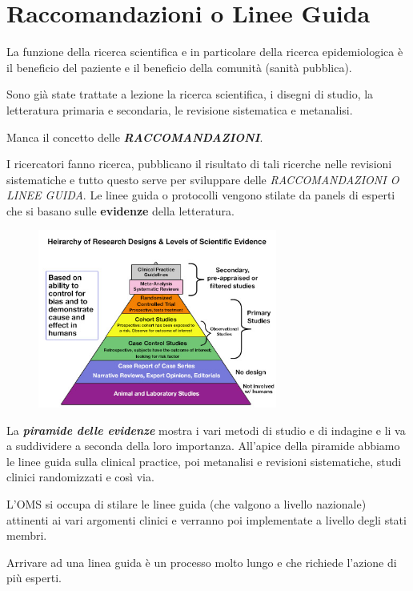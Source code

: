 \section{Raccomandazioni o Linee Guida}

La funzione della ricerca scientifica e in particolare della ricerca epidemiologica è il beneficio del paziente e il beneficio della comunità (sanità pubblica).

Sono già state trattate a lezione la ricerca scientifica, i disegni di studio, la letteratura primaria e secondaria, le revisione sistematica e metanalisi.

Manca il concetto delle \textbf{\emph{RACCOMANDAZIONI}}.

I ricercatori fanno ricerca, pubblicano il risultato di tali ricerche nelle revisioni sistematiche e tutto questo serve per sviluppare delle \emph{RACCOMANDAZIONI O LINEE GUIDA}. Le linee guida o protocolli vengono stilate da panels di esperti che si basano sulle \textbf{evidenze} della letteratura.

\begin{figure}[!ht]
\centering
\includegraphics[width=0.7\textwidth]{05/image1.png}
\end{figure}

La \textbf{\emph{piramide delle evidenze}} mostra i vari metodi di studio e di indagine e li va a suddividere a seconda della loro importanza. All'apice della piramide abbiamo le linee guida sulla clinical practice, poi metanalisi e revisioni sistematiche, studi clinici randomizzati e così via.

L'OMS si occupa di stilare le linee guida (che valgono a livello nazionale) attinenti ai vari argomenti clinici e verranno poi implementate a livello degli stati membri.

Arrivare ad una linea guida è un processo molto lungo e che richiede l'azione di più esperti.

